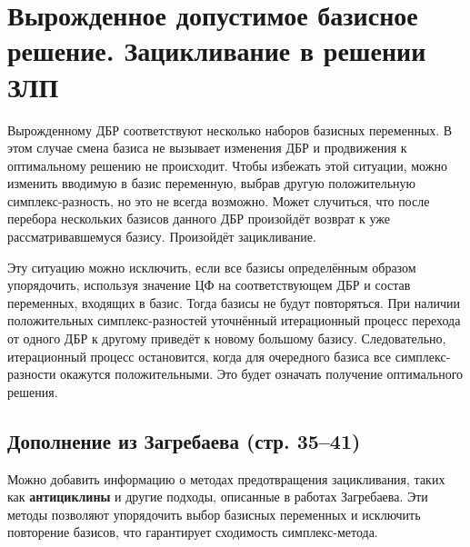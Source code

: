 \documentclass[17pt]{extarticle}
\begin{document}
\section{Вырожденное допустимое базисное решение. Зацикливание в решении ЗЛП}

Вырожденному ДБР соответствуют несколько наборов базисных переменных. В этом случае смена базиса не вызывает изменения ДБР и продвижения к оптимальному решению не происходит. Чтобы избежать этой ситуации, можно изменить вводимую в базис переменную, выбрав другую положительную симплекс-разность, но это не всегда возможно. Может случиться, что после перебора нескольких базисов данного ДБР произойдёт возврат к уже рассматривавшемуся базису. Произойдёт зацикливание.

Эту ситуацию можно исключить, если все базисы определённым образом упорядочить, используя значение ЦФ на соответствующем ДБР и состав переменных, входящих в базис. Тогда базисы не будут повторяться. При наличии положительных симплекс-разностей уточнённый итерационный процесс перехода от одного ДБР к другому приведёт к новому большому базису. Следовательно, итерационный процесс остановится, когда для очередного базиса все симплекс-разности окажутся положительными. Это будет означать получение оптимального решения.

\subsection{Дополнение из Загребаева (стр. 35–41)}
Можно добавить информацию о методах предотвращения зацикливания, таких как \textbf{антициклины} и другие подходы, описанные в работах Загребаева. Эти методы позволяют упорядочить выбор базисных переменных и исключить повторение базисов, что гарантирует сходимость симплекс-метода.
\end{document}
